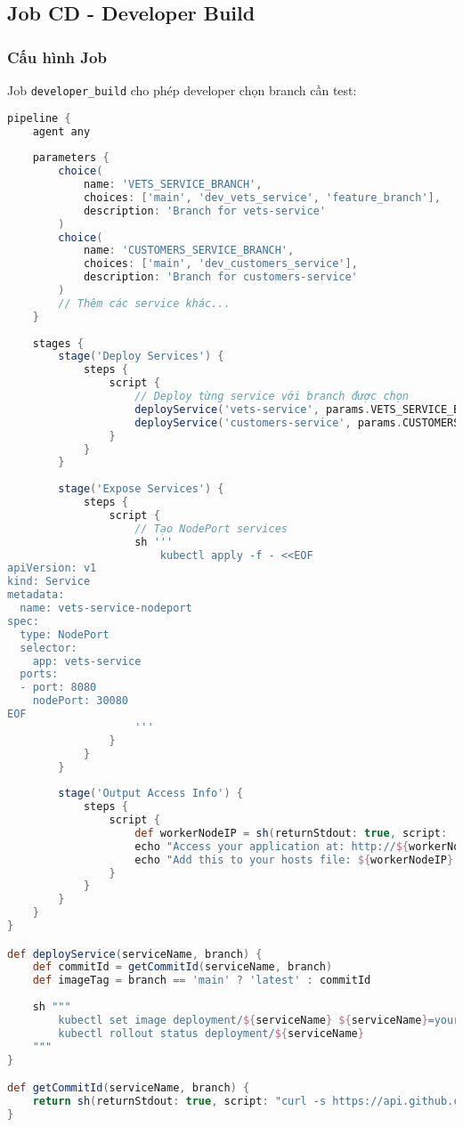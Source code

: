 \documentclass[12pt,a4paper]{article}
\begin{document}
\subsection{Job CD - Developer Build}

\subsubsection{Cấu hình Job}
Job \texttt{developer\_build} cho phép developer chọn branch cần test:

\begin{lstlisting}[language=groovy, caption=Job developer\_build với parameters]
pipeline {
    agent any
    
    parameters {
        choice(
            name: 'VETS_SERVICE_BRANCH',
            choices: ['main', 'dev_vets_service', 'feature_branch'],
            description: 'Branch for vets-service'
        )
        choice(
            name: 'CUSTOMERS_SERVICE_BRANCH', 
            choices: ['main', 'dev_customers_service'],
            description: 'Branch for customers-service'
        )
        // Thêm các service khác...
    }
    
    stages {
        stage('Deploy Services') {
            steps {
                script {
                    // Deploy từng service với branch được chọn
                    deployService('vets-service', params.VETS_SERVICE_BRANCH)
                    deployService('customers-service', params.CUSTOMERS_SERVICE_BRANCH)
                }
            }
        }
        
        stage('Expose Services') {
            steps {
                script {
                    // Tạo NodePort services
                    sh '''
                        kubectl apply -f - <<EOF
apiVersion: v1
kind: Service
metadata:
  name: vets-service-nodeport
spec:
  type: NodePort
  selector:
    app: vets-service
  ports:
  - port: 8080
    nodePort: 30080
EOF
                    '''
                }
            }
        }
        
        stage('Output Access Info') {
            steps {
                script {
                    def workerNodeIP = sh(returnStdout: true, script: 'kubectl get nodes -o wide | grep worker | awk \'{print $6}\'').trim()
                    echo "Access your application at: http://${workerNodeIP}:30080"
                    echo "Add this to your hosts file: ${workerNodeIP} dev.yourapp.local"
                }
            }
        }
    }
}

def deployService(serviceName, branch) {
    def commitId = getCommitId(serviceName, branch)
    def imageTag = branch == 'main' ? 'latest' : commitId
    
    sh """
        kubectl set image deployment/${serviceName} ${serviceName}=your-dockerhub/${serviceName}:${imageTag}
        kubectl rollout status deployment/${serviceName}
    """
}

def getCommitId(serviceName, branch) {
    return sh(returnStdout: true, script: "curl -s https://api.github.com/repos/your-org/${serviceName}/commits/${branch} | jq -r '.sha[0:7]'").trim()
}
\end{lstlisting}
\end{document}

